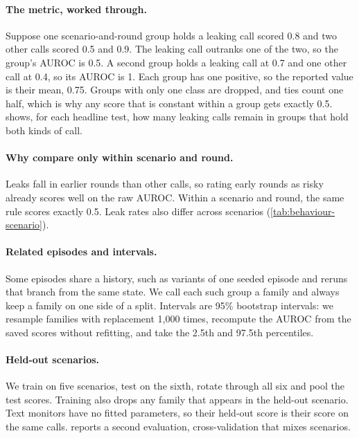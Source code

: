 \paragraph{The metric, worked through.}
Suppose one scenario-and-round group holds a leaking call scored 0.8 and two other calls scored 0.5 and 0.9.
The leaking call outranks one of the two, so the group's AUROC is 0.5.
A second group holds a leaking call at 0.7 and one other call at 0.4, so its AUROC is 1.
Each group has one positive, so the reported value is their mean, 0.75.
Groups with only one class are dropped, and ties count one half, which is why any score that is constant within a group gets exactly 0.5.
 shows, for each headline test, how many leaking calls remain in groups that hold both kinds of call.

\begin{table}[h]
  \centering
  \small
  
  \caption{Scenario-and-round groups kept by the metric, and the leaking calls they contain, for each headline test.}
  \label{tab:group-coverage}
\end{table}

\paragraph{Why compare only within scenario and round.}
Leaks fall in earlier rounds than other calls, so rating early rounds as risky already scores well on the raw AUROC.
Within a scenario and round, the same rule scores exactly 0.5.
Leak rates also differ across scenarios (\cref{tab:behaviour-scenario}).

\paragraph{Related episodes and intervals.}
Some episodes share a history, such as variants of one seeded episode and reruns that branch from the same state.
We call each such group a family and always keep a family on one side of a split.
Intervals are 95\% bootstrap intervals: we resample families with replacement 1,000 times, recompute the AUROC from the saved scores without refitting, and take the 2.5th and 97.5th percentiles.

\paragraph{Held-out scenarios.}
We train on five scenarios, test on the sixth, rotate through all six and pool the test scores.
Training also drops any family that appears in the held-out scenario.
Text monitors have no fitted parameters, so their held-out score is their score on the same calls.
 reports a second evaluation, cross-validation that mixes scenarios.
